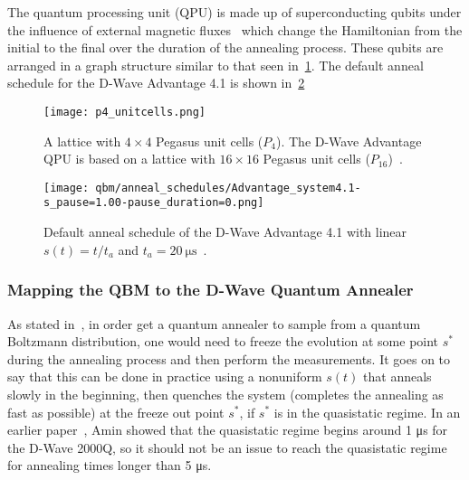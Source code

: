 The quantum processing unit (QPU) is made up of superconducting qubits under the influence of external magnetic fluxes~\cite{qc_lecture_notes} which change the Hamiltonian from the initial to the final over the duration of the annealing process.
These qubits are arranged in a graph structure similar to that seen in~\cref{fig:p4_unitcells}.
The default anneal schedule for the D-Wave Advantage 4.1 is shown in~\cref{fig:anneal_schedule_default}
\begin{figure}[!htb]
    \begin{center}
        \texttt{[image: p4\_unitcells.png]}
    \end{center}
    \caption{
        A lattice with \( 4 \times 4 \) Pegasus unit cells (\( P_4 \)).
        The D-Wave Advantage QPU is based on a lattice with \( 16 \times 16 \) Pegasus unit cells (\( P_{16} \))~\cite{dwave_topologies}.
    }
    \label{fig:p4_unitcells}
\end{figure}
\begin{figure}[!htb]
    \begin{center}
        \texttt{[image: qbm/anneal\_schedules/Advantage\_system4.1-s\_pause=1.00-pause\_duration=0.png]}
    \end{center}
    \caption{
        Default anneal schedule of the D-Wave Advantage 4.1 with linear \( s(t) = t / t_a \) and \( t_a = 20 \ \si{\micro\second} \)~\cite{dwave_anneal_schedules}.
    }
    \label{fig:anneal_schedule_default}
\end{figure}

\subsubsection{Mapping the QBM to the D-Wave Quantum Annealer}
As stated in~\cite{amin_2018}, in order get a quantum annealer to sample from a quantum Boltzmann distribution, one would need to freeze the evolution at some point \( s^* \) during the annealing process and then perform the measurements.
It goes on to say that this can be done in practice using a nonuniform \( s(t) \) that anneals slowly in the beginning, then quenches the system (completes the annealing as fast as possible) at the freeze out point \( s^* \), if \( s^* \) is in the quasistatic regime.
In an earlier paper~\cite{amin_2015}, Amin showed that the quasistatic regime begins around 1 \si{\micro\second} for the D-Wave 2000Q, so it should not be an issue to reach the quasistatic regime for annealing times longer than 5 \si{\micro\second}.

